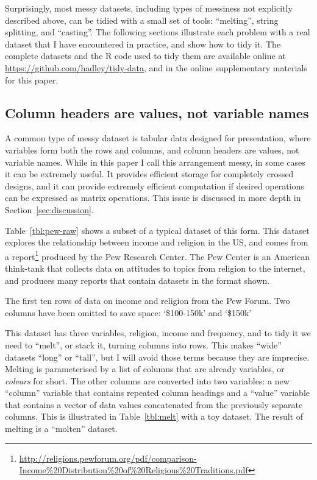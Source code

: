 \documentclass[article]{jss}
\begin{document}
Surprisingly, most messy datasets, including types of messiness not explicitly described above, can be tidied with a small set of tools: ``melting'', string splitting, and ``casting''. The following sections illustrate each problem with a real dataset that I have encountered in practice, and show how to tidy it. The complete datasets and the R code used to tidy them are available online at \url{https://github.com/hadley/tidy-data}, and in the online supplementary materials for this paper.

\subsection{Column headers are values, not variable names}

A common type of messy dataset is tabular data designed for presentation, where variables form both the rows and columns, and column headers are values, not variable names. While in this paper I call this arrangement messy, in some cases it can be extremely useful. It provides efficient storage for completely crossed designs, and it can provide extremely efficient computation if desired operations can be expressed as matrix operations. This issue is discussed in more depth in Section~\ref{sec:discussion}.

Table~\ref{tbl:pew-raw} shows a subset of a typical dataset of this form. This dataset explores the relationship between income and religion in the US, and comes from a report\footnote{\url{http://religions.pewforum.org/pdf/comparison-Income\%20Distribution\%20of\%20Religious\%20Traditions.pdf}} produced by the Pew Research Center. The Pew Center is an American think-tank that collects data on attitudes to topics from religion to the internet, and produces many reports that contain datasets in the format shown.

\begin{table}[htbp]
  \centering
  
  \caption{The first ten rows of data on income and religion from the Pew Forum. Two columns have been omitted to save space: `\$100-150k' and `\$150k'} 
  \label{tbl:pew-raw}
\end{table}

This dataset has three variables, religion, income and frequency, and to tidy it we need to ``melt'', or stack it, turning columns into rows. This makes ``wide'' datasets ``long'' or ``tall'', but I will avoid those terms because they are imprecise. Melting is parameterised by a list of columns that are already variables, or \emph{colvars} for short. The other columns are converted into two variables: a new ``column'' variable that contains repeated column headings and a ``value'' variable that contains a vector of data values concatenated from the previously separate columns. This is illustrated in Table~\ref{tbl:melt} with a toy dataset. The result of melting is a ``molten'' dataset.
\end{document}
